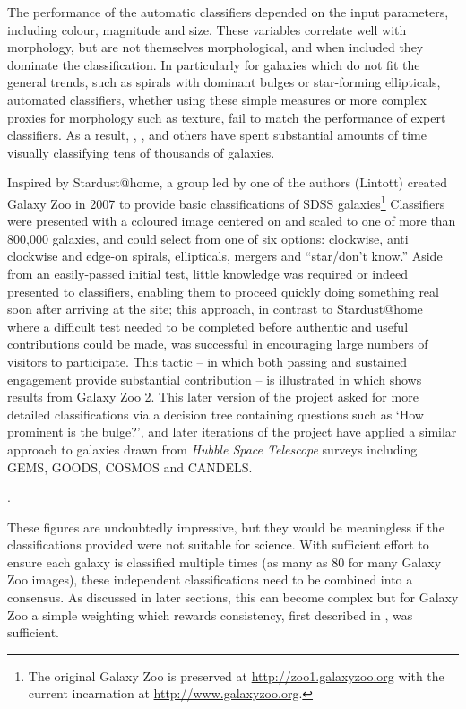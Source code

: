 \documentclass{ar2e}
\begin{document}
The performance of the automatic classifiers depended on the input parameters,
including colour, magnitude and size. These variables correlate well with
morphology, but are not themselves morphological, and when included they
dominate the classification. In particularly for galaxies which do not fit the
general trends, such as spirals with dominant bulges or star-forming
ellipticals, automated classifiers, whether using these simple measures or
more complex proxies for morphology such as texture, fail to match the
performance of expert classifiers. As a result, \citet{Scha2007},
\citet{Nair}, and others have spent substantial amounts of time visually
classifying tens of thousands of galaxies. 

Inspired by Stardust@home, a group led by one of the authors (Lintott) created
Galaxy Zoo in 2007 to provide basic classifications of SDSS
galaxies\footnote{The original Galaxy Zoo is preserved at
\url{http://zoo1.galaxyzoo.org} with the current incarnation at
\url{http://www.galaxyzoo.org}.} Classifiers were presented with a coloured
image centered on and scaled to one of more than 800,000 galaxies, and could
select from one of six options: clockwise, anti clockwise and edge-on spirals,
ellipticals, mergers and ``star/don't know.'' Aside from  an easily-passed
initial test, little knowledge was required or indeed presented to classifiers,
enabling them to proceed quickly doing something real soon after arriving at the
site; this approach, in contrast to Stardust@home where a difficult test needed
to be completed before authentic and useful contributions could be made, was
successful in encouraging large numbers of visitors to participate. This tactic
-- in which both passing and sustained engagement provide substantial
contribution -- is illustrated in \Fref{}  which shows results from Galaxy Zoo
2. 
This later version of the project asked for more detailed
classifications via a decision tree containing questions such as `How prominent
is the bulge?', and later iterations of the project have applied a similar
approach to galaxies drawn from \emph{Hubble Space Telescope} surveys including
\textsc{GEMS, GOODS, COSMOS} and \textsc{CANDELS}. 

. 

These figures are undoubtedly impressive, but they would be meaningless if the
classifications provided were not suitable for science. With sufficient effort
to ensure each galaxy is classified multiple times (as many as 80 for many
Galaxy Zoo images), these independent classifications need to be combined into a
consensus. As discussed in later sections, this can become complex but for
Galaxy Zoo a simple weighting which rewards consistency, first described in
\citet{Land++}, was sufficient. 
\end{document}
